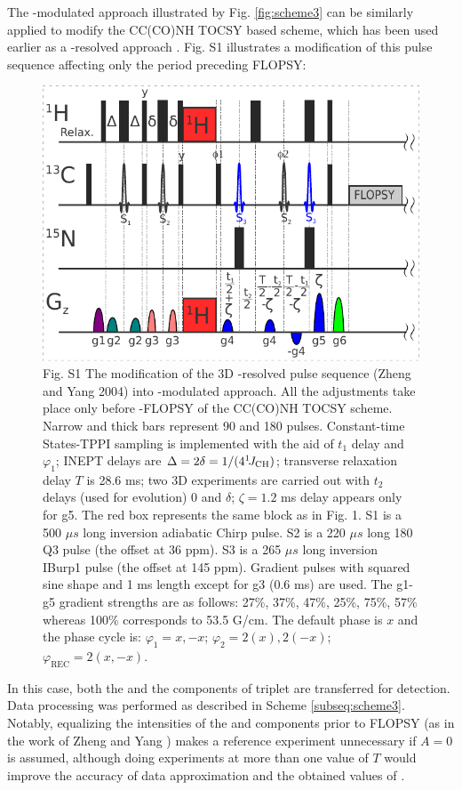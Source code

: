 \documentclass[smallextended]{svjour3}
\begin{document}
\newpage
The \oneJch-modulated approach illustrated by Fig. \ref{fig:scheme3} 
      can be similarly applied to modify the {CC(CO)NH} {TOCSY} based 
      scheme, which has been used earlier as a \oneJch-resolved approach
      \cite{zheng_measurement_2004}. Fig. S1 illustrates a modification of
      this pulse sequence affecting only the period preceding \clab{} 
      {FLOPSY}:
\begin{figure}
    \centering
    \includegraphics{FigS1}
    \caption{
       Fig. S1 The modification of the 3D \oneJch-resolved pulse sequence (Zheng and Yang 2004) into \oneJch-modulated approach. All the adjustments take place only before \clab{}-FLOPSY of the CC(CO)NH TOCSY scheme. Narrow and thick bars represent 90\degree{} and 180\degree{} pulses. Constant-time \clab{} States-TPPI sampling is implemented with the aid of $t_1$ delay and $\varphi_1$; INEPT delays are $\Delta = 2\delta = 1/(4^1\!J_\text{CH})$; transverse relaxation delay $T$ is 28.6 ms; two 3D experiments are carried out with $t_2$ delays (used for \oneJch evolution) 0 and $\delta$; $\zeta = 1.2$ ms delay appears only for g5. The red box represents the same block as in Fig. 1. S1 is a 500 $\mu s$ long \clab{} inversion adiabatic Chirp pulse. S2 is a 220 $\mu s$ long 180\degree{} Q3 pulse (the offset at 36 ppm). S3 is a 265 $\mu s$ long inversion IBurp1 pulse (the offset at 145 ppm). Gradient pulses with squared sine shape and 1 ms length except for g3 (0.6 ms) are used. The g1-g5 gradient strengths are as follows: 27\%, 37\%, 47\%, 25\%, 75\%, 57\% whereas 100\% corresponds to 53.5 G/cm. The default phase is $x$ and the phase cycle is:
       $\varphi_1 = x, -x$;
       $\varphi_2 = 2(x), 2(-x)$;
       $\varphi_\text{REC} = 2(x, -x)$.
    }
    \label{fig:scheme4}
\end{figure}
In this case, both the \qouter{} and the \qinner{} 
      components of \clab{} triplet are transferred for detection. 
      Data processing was performed as described in Scheme
      \ref{subseq:scheme3}. Notably, equalizing the intensities of the 
      \qouter{} and \qinner{} components prior to {FLOPSY} (as in the work 
      of Zheng and Yang \cite{zheng_measurement_2004}) makes a reference
      experiment unnecessary if $A = 0$ is assumed, although doing 
      experiments at more than one value of $T$ would improve the accuracy 
      of data approximation and the obtained values of \gtwoCH.
\end{document}

